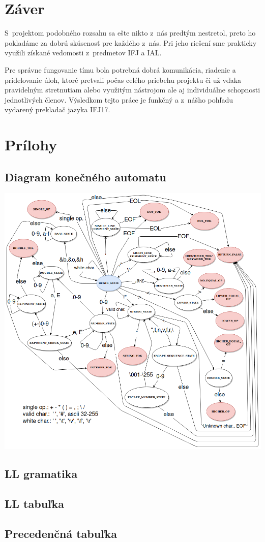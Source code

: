 \documentclass{article}
\begin{document}
    \section{Záver}
    S~projektom podobného rozsahu sa ešte nikto z~nás predtým nestretol, preto ho pokladáme za dobrú
    skúsenosť pre každého z~nás. Pri jeho riešení sme prakticky využili získané vedomosti z~predmetov 
    IFJ a IAL.
    
    Pre správne fungovanie tímu bola potrebná dobrá komunikácia, riadenie a pridelovanie úloh, ktoré pretvali počas celého
    priebehu projektu či už vďaka pravidelným stretnutiam alebo využitým nástrojom ale aj individuálne
    schopnosti jednotlivých členov. Výsledkom tejto práce je funkčný a z~nášho pohľadu vydarený 
    prekladač jazyka IFJ17.
    
    \newpage
    \section{Prílohy}
        \subsection{Diagram konečného automatu}
            \includegraphics[trim=6cm 0 0 0, width=15cm]{finite_automata.png}
        \subsection{LL gramatika}
        \subsection{LL tabuľka}
        \subsection{Precedenčná tabuľka}
\end{document}
